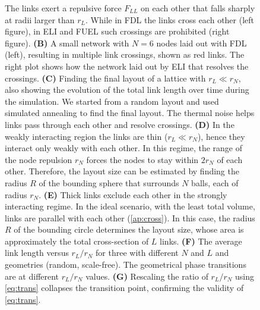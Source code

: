 \documentclass[nofootinbib,preprint,floatfix,titlepage,superscriptaddress]{revtex4} %
\begin{document}
\begin{figure}
{    The links exert a repulsive force $F_{LL}$  on each other that falls sharply at radii larger than $r_L$. 
    While in FDL the links cross each other (left figure), in ELI and FUEL such crossings are prohibited (right figure). 
    {\bf(B)} A small network with $N=6$ nodes laid out with FDL (left), resulting in multiple link crossings, shown as red links.   
    The right plot shows how the network laid out by ELI that resolves the crossings.
    {\bf (C)} Finding the final layout of a lattice with $r_L\ll r_N$, also showing the evolution of the total link length over time during the simulation. 
    We started from a random layout and used simulated annealing to find the final layout.
    The thermal noise helps links pass through each other and resolve crossings.
    {\bf (D)} In the weakly interacting region the links are thin ($r_L\ll r_N$), hence they interact only weakly with each other. 
    In this regime, the range of the node repulsion $r_N$ forces the nodes to stay within $2r_N$ of each other. 
    Therefore, the layout size can be estimated by finding the radius $R$ of the bounding sphere that surrounds $N$ balls, each of radius $r_N$. 
    {\bf (E)} Thick links exclude each other  in the strongly interacting regime. 
    In the ideal scenario, with the least total volume, links are parallel with each other (\ref{ap:cross}). 
    In this case, the radius $R$ of the bounding circle determines the layout size, whose area is approximately the total cross-section of $L$ links. 
    {\bf (F)} The average link length versus $r_L/r_N$ for three with different $N$ and $L$ and geometries (random, scale-free). 
    The geometrical phase transitions are at different $r_L/r_N$ values. 
    {\bf (G)} Rescaling the ratio of $r_L/r_N$ using \eqref{eq:trans}  collapses the transition point, %
    confirming the validity of \eqref{eq:trans}. }
    \label{fig:trans}
    \label{fig:crs-lat}
\end{figure}
\end{document}

